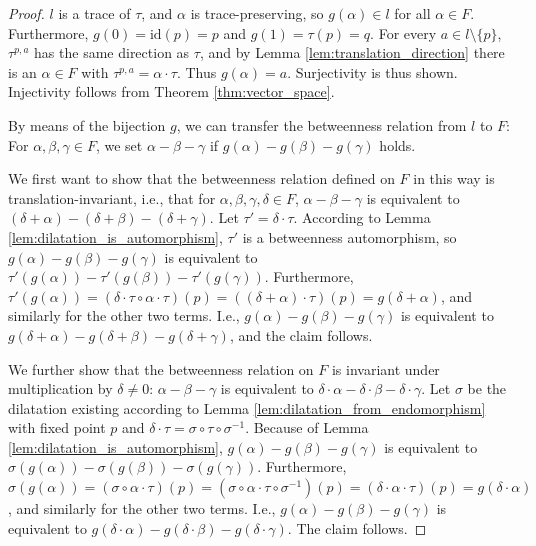 \documentclass[11pt,a4paper]{article}
\newcommand{\betw}[3]{#1 - #2 - #3}
\begin{document}
\begin{proof}
$l$ is a trace of $\tau$, and $\alpha$ is trace-preserving, so $g(\alpha) \in l$ for all $\alpha \in F$. Furthermore, $g(0) = \text{id}(p) = p$ and $g(1) = \tau(p) = q$. For every $a \in l \setminus \{p\}$, $\tau^{p,a}$ has the same direction as $\tau$, and by Lemma \ref{lem:translation_direction} there is an $\alpha \in F$ with $\tau^{p,a} = \alpha \cdot \tau$. Thus $g(\alpha) = a$. Surjectivity is thus shown. Injectivity follows from Theorem \ref{thm:vector_space}.

By means of the bijection $g$, we can transfer the betweenness relation from $l$ to $F$: For $\alpha, \beta, \gamma \in F$, we set $\betw{\alpha}{\beta}{\gamma}$ if $\betw{g(\alpha)}{g(\beta)}{g(\gamma)}$ holds.

We first want to show that the betweenness relation defined on $F$ in this way is translation-invariant, i.e., that for $\alpha, \beta, \gamma, \delta \in F$, $\betw{\alpha}{\beta}{\gamma}$ is equivalent to $\betw{(\delta + \alpha)}{(\delta + \beta)}{(\delta + \gamma)}$. Let $\tau' = \delta \cdot \tau$. According to Lemma \ref{lem:dilatation_is_automorphism}, $\tau'$ is a betweenness automorphism, so $\betw{g(\alpha)}{g(\beta)}{g(\gamma)}$ is equivalent to $\betw{\tau'(g(\alpha))}{\tau'(g(\beta))}{\tau'(g(\gamma))}$. Furthermore, $\tau'(g(\alpha)) = (\delta \cdot \tau \circ \alpha \cdot \tau)(p) = ((\delta + \alpha) \cdot \tau)(p) = g(\delta + \alpha)$, and similarly for the other two terms. I.e., $\betw{g(\alpha)}{g(\beta)}{g(\gamma)}$ is equivalent to $\betw{g(\delta + \alpha)}{g(\delta + \beta)}{g(\delta + \gamma)}$, and the claim follows.

We further show that the betweenness relation on $F$ is invariant under multiplication by $\delta \neq 0$: $\betw{\alpha}{\beta}{\gamma}$ is equivalent to $\betw{\delta \cdot \alpha}{\delta \cdot \beta}{\delta \cdot \gamma}$. Let $\sigma$ be the dilatation existing according to Lemma \ref{lem:dilatation_from_endomorphism} with fixed point $p$ and $\delta \cdot \tau = \sigma \circ \tau \circ \sigma^{-1}$. Because of Lemma \ref{lem:dilatation_is_automorphism}, $\betw{g(\alpha)}{g(\beta)}{g(\gamma)}$ is equivalent to $\betw{\sigma(g(\alpha))}{\sigma(g(\beta))}{\sigma(g(\gamma))}$. Furthermore, $\sigma(g(\alpha)) = (\sigma \circ \alpha \cdot \tau)(p) = (\sigma \circ \alpha \cdot \tau \circ \sigma^{-1})(p) = (\delta \cdot \alpha \cdot \tau)(p) = g(\delta \cdot \alpha)$, and similarly for the other two terms. I.e., $\betw{g(\alpha)}{g(\beta)}{g(\gamma)}$ is equivalent to $\betw{g(\delta \cdot \alpha)}{g(\delta \cdot \beta)}{g(\delta \cdot \gamma)}$. The claim follows.


\end{proof}
\end{document}
